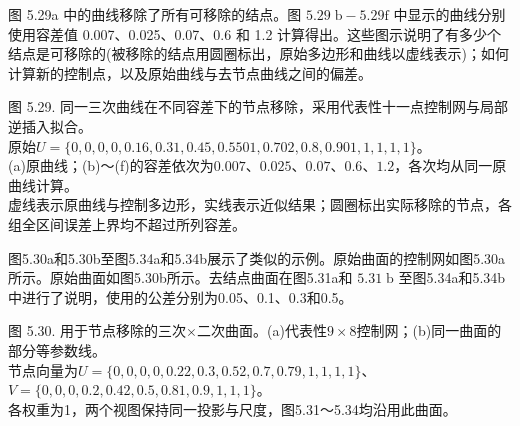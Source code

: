 \documentclass[../main.tex]{subfiles}
\begin{document}
图 5.29a 中的曲线移除了所有可移除的结点。图 \({5.29}\mathrm{\;b} - {5.29}\mathrm{f}\) 中显示的曲线分别使用容差值 0.007、0.025、0.07、0.6 和 1.2 计算得出。这些图示说明了有多少个结点是可移除的(被移除的结点用圆圈标出，原始多边形和曲线以虚线表示)；如何计算新的控制点，以及原始曲线与去节点曲线之间的偏差。







\begin{center}
\begin{minipage}{31.4cm}
\vspace*{.6\baselineskip}
\centering
{}
\par\medskip
{}
\par\medskip
{}
\par\smallskip
图 5.29. 同一三次曲线在不同容差下的节点移除，采用代表性十一点控制网与局部逆插入拟合。\\
原始$U=\{0,0,0,0,0.16,0.31,0.45,0.5501,0.702,0.8,0.901,1,1,1,1\}$。\\
(a)原曲线；(b)～(f)的容差依次为$0.007$、$0.025$、$0.07$、$0.6$、$1.2$，各次均从同一原曲线计算。\\
虚线表示原曲线与控制多边形，实线表示近似结果；圆圈标出实际移除的节点，各组全区间误差上界均不超过所列容差。
\end{minipage}
\end{center}

图5.30a和5.30b至图5.34a和5.34b展示了类似的示例。原始曲面的控制网如图5.30a所示。原始曲面如图5.30b所示。去结点曲面在图5.31a和 \({5.31}\mathrm{\;b}\) 至图5.34a和5.34b中进行了说明，使用的公差分别为0.05、0.1、0.3和0.5。




\begin{center}
\begin{minipage}{26cm}
\vspace*{.6\baselineskip}
\centering
{}
\par\smallskip
图 5.30. 用于节点移除的三次$\times$二次曲面。(a)代表性$9\times8$控制网；(b)同一曲面的部分等参数线。\\
节点向量为$U=\{0,0,0,0,0.22,0.3,0.52,0.7,0.79,1,1,1,1\}$、$V=\{0,0,0,0.2,0.42,0.5,0.81,0.9,1,1,1\}$。\\
各权重为1，两个视图保持同一投影与尺度，图5.31～5.34均沿用此曲面。
\end{minipage}
\end{center}
\end{document}
